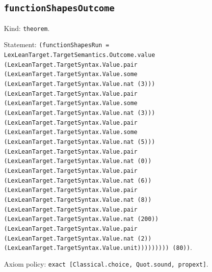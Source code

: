 \documentclass[11pt]{article}
\begin{document}
\subsection*{\texttt{functionShapesOutcome}}
\noindent Kind: \texttt{theorem}.\par
\noindent Statement: \texttt{(functionShapesRun = LexLeanTarget.TargetSemantics.Outcome.value (LexLeanTarget.TargetSyntax.Value.pair (LexLeanTarget.TargetSyntax.Value.some (LexLeanTarget.TargetSyntax.Value.nat (3))) (LexLeanTarget.TargetSyntax.Value.pair (LexLeanTarget.TargetSyntax.Value.some (LexLeanTarget.TargetSyntax.Value.nat (3))) (LexLeanTarget.TargetSyntax.Value.pair (LexLeanTarget.TargetSyntax.Value.some (LexLeanTarget.TargetSyntax.Value.nat (5))) (LexLeanTarget.TargetSyntax.Value.pair (LexLeanTarget.TargetSyntax.Value.nat (0)) (LexLeanTarget.TargetSyntax.Value.pair (LexLeanTarget.TargetSyntax.Value.nat (6)) (LexLeanTarget.TargetSyntax.Value.pair (LexLeanTarget.TargetSyntax.Value.nat (8)) (LexLeanTarget.TargetSyntax.Value.pair (LexLeanTarget.TargetSyntax.Value.nat (200)) (LexLeanTarget.TargetSyntax.Value.pair (LexLeanTarget.TargetSyntax.Value.nat (2)) (LexLeanTarget.TargetSyntax.Value.unit))))))))) (80))}.\par
\noindent Axiom policy: \texttt{exact [Classical.choice, Quot.sound, propext]}.\par
\end{document}
